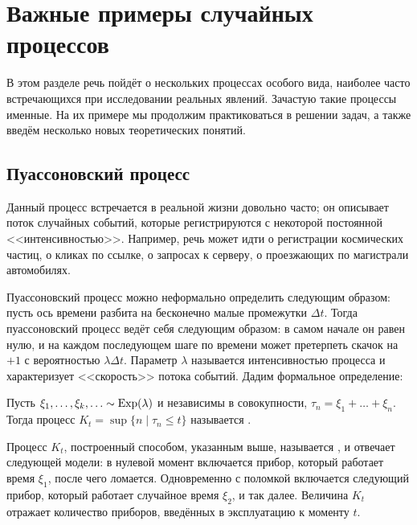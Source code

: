 \section{Важные примеры случайных процессов} \label{section:special}

В этом разделе речь пойдёт о нескольких процессах особого вида,
наиболее часто встречающихся при исследовании реальных явлений.
Зачастую такие процессы именные.
На их примере мы продолжим практиковаться в решении задач,
а также введём несколько новых теоретических понятий.


\subsection{Пуассоновский процесс} \label{subsection:Poisson}

Данный процесс встречается в реальной жизни довольно часто;
он описывает поток случайных событий, которые регистрируются с некоторой постоянной <<интенсивностью>>.
Например, речь может идти о регистрации космических частиц, о кликах по ссылке,
о запросах к серверу, о проезжающих по магистрали автомобилях.

Пуассоновский процесс можно неформально определить следующим образом:
пусть ось времени разбита на бесконечно малые промежутки $ \Delta t $.
Тогда пуассоновский процесс ведёт себя следующим образом:
в самом начале он равен нулю,
и на каждом последующем шаге по времени может претерпеть скачок на $ + 1 $ с вероятностью $ \lambda \Delta t $.
Параметр $ \lambda $ называется интенсивностью процесса и характеризует <<скорость>> потока событий.
Дадим формальное определение:

\begin{definition}
    \label{definition:special:Poisson_process_explicit_definition}
    Пусть $ \xi_1, \ldots, \xi_k, \ldots \sim \textnormal{Exp}(\lambda) $ и независимы в совокупности,
    $ \tau_n = \xi_1 + \ldots + \xi_n $.
    Тогда процесс $ K_t = \sup \{ n \mid \tau_n \leqslant t \} $ называется .
\end{definition}

Процесс $ K_t $, построенный
способом, указанным выше,
называется , и отвечает следующей модели:
в нулевой момент включается прибор, который работает время $ \xi_1 $, после чего ломается.
Одновременно с поломкой включается следующий прибор, который работает случайное время $ \xi_2 $, и так далее.
Величина $ K_t $ отражает количество приборов, введённых в эксплуатацию к моменту $ t $.

